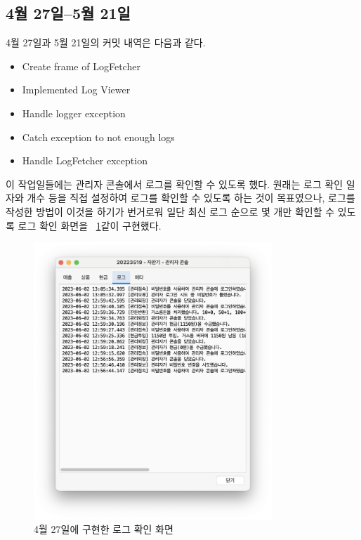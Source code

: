 \documentclass{oblivoir}
\newcommand{\figref}[1]{\figurename~\ref{#1}}
\begin{document}
    \subsection{4월 27일--5월 21일}

    4월 27일과 5월 21일의 커밋 내역은 다음과 같다.
    \begin{itemize}
        \item Create frame of LogFetcher
        \item Implemented Log Viewer
        \item Handle logger exception
        \item Catch exception to not enough logs
        \item Handle LogFetcher exception
    \end{itemize}

    이 작업일들에는 관리자 콘솔에서 로그를 확인할 수 있도록 했다.
    원래는 로그 확인 일자와 개수 등을 직접 설정하여 로그를 확인할 수 있도록 하는 것이 목표였으나,
    로그를 작성한 방법이 이것을 하기가 번거로워 일단 최신 로그 순으로 몇 개만 확인할 수 있도록 로그 확인 화면을
    \figref{fig:0427-log-console}\와 같이 구현했다.
    \begin{figure}[h]
        \centering
        \includegraphics[width=0.8\textwidth]{images/dev-snapshop/0427-log-console}
        \caption{4월 27일에 구현한 로그 확인 화면}
        \label{fig:0427-log-console}
    \end{figure}
\end{document}
